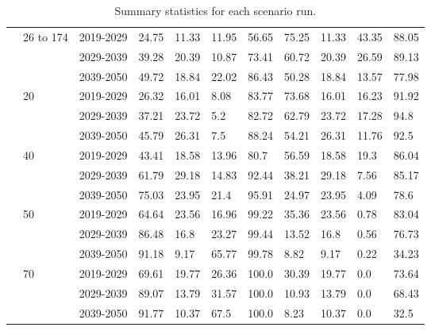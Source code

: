 \begin{table}[H]
\begin{tabular}{|l|l|l|l|l|l|l|l|l|l|l|}
		& \multirow{3}{*}{26 to 174} & 2019-2029 & 24.75 & 11.33 & 11.95 & 56.65 & 75.25 & 11.33 & 43.35 & 88.05 \\ \cline{3-11} 
		&  & 2029-2039 & 39.28 & 20.39 & 10.87 & 73.41 & 60.72 & 20.39 & 26.59 & 89.13 \\ \cline{3-11} 
		&  & 2039-2050 & 49.72 & 18.84 & 22.02 & 86.43 & 50.28 & 18.84 & 13.57 & 77.98 \\ \cline{2-11} 
		& \multirow{3}{*}{20} & 2019-2029 & 26.32 & 16.01 & 8.08 & 83.77 & 73.68 & 16.01 & 16.23 & 91.92 \\ \cline{3-11} 
		&  & 2029-2039 & 37.21 & 23.72 & 5.2 & 82.72 & 62.79 & 23.72 & 17.28 & 94.8 \\ \cline{3-11} 
		&  & 2039-2050 & 45.79 & 26.31 & 7.5 & 88.24 & 54.21 & 26.31 & 11.76 & 92.5 \\ \cline{2-11} 
		& \multirow{3}{*}{40} & 2019-2029 & 43.41 & 18.58 & 13.96 & 80.7 & 56.59 & 18.58 & 19.3 & 86.04 \\ \cline{3-11} 
		&  & 2029-2039 & 61.79 & 29.18 & 14.83 & 92.44 & 38.21 & 29.18 & 7.56 & 85.17 \\ \cline{3-11} 
		&  & 2039-2050 & 75.03 & 23.95 & 21.4 & 95.91 & 24.97 & 23.95 & 4.09 & 78.6 \\ \cline{2-11} 
		& \multirow{3}{*}{50} & 2019-2029 & 64.64 & 23.56 & 16.96 & 99.22 & 35.36 & 23.56 & 0.78 & 83.04 \\ \cline{3-11} 
		&  & 2029-2039 & 86.48 & 16.8 & 23.27 & 99.44 & 13.52 & 16.8 & 0.56 & 76.73 \\ \cline{3-11} 
		&  & 2039-2050 & 91.18 & 9.17 & 65.77 & 99.78 & 8.82 & 9.17 & 0.22 & 34.23 \\ \cline{2-11} 
		& \multirow{3}{*}{70} & 2019-2029 & 69.61 & 19.77 & 26.36 & 100.0 & 30.39 & 19.77 & 0.0 & 73.64 \\ \cline{3-11} 
		&  & 2029-2039 & 89.07 & 13.79 & 31.57 & 100.0 & 10.93 & 13.79 & 0.0 & 68.43 \\ \cline{3-11} 
		&  & 2039-2050 & 91.77 & 10.37 & 67.5 & 100.0 & 8.23 & 10.37 & 0.0 & 32.5 \\ \hline
	\end{tabular}
	\caption{Summary statistics for each scenario run.}
	
	\label{table:scenario_statistics} 
	
\end{table}